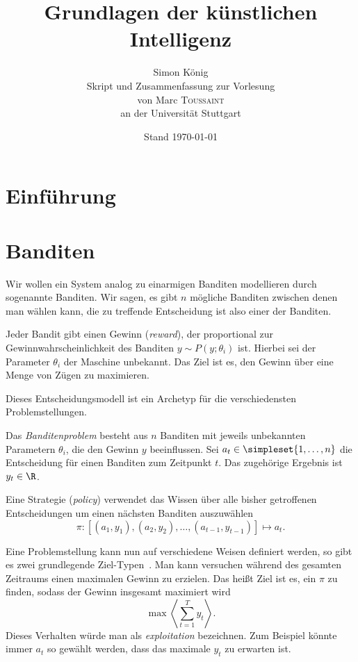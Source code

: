\documentclass[ngerman]{../LaTeX-Templates/Paper/paper}
\title{Grundlagen der künstlichen Intelligenz}
\author{Simon König\\Skript und Zusammenfassung zur Vorlesung\\ von Marc \textsc{Toussaint}\\an der Universität Stuttgart}
\date{Stand \today}
\newcommand{\countset}[1]{\simpleset{1,\ldots,#1}}
\newcommand{\enqo}[1]{\glqq #1\grqq\ }
\begin{document}
\maketitle%
\tableofcontents

\section{Einführung}



\section{Banditen}
Wir wollen ein System analog zu einarmigen Banditen modellieren durch sogenannte \glqq Banditen\grqq. Wir sagen, es gibt $n$ mögliche Banditen zwischen denen man wählen kann, die zu treffende Entscheidung ist also einer der Banditen.

Jeder Bandit gibt einen Gewinn (\emph{reward}), der proportional zur Gewinnwahrscheinlichkeit des Banditen $y\sim P(y;\theta_i)$ ist. Hierbei sei der Parameter $\theta_i$ der Maschine unbekannt. Das Ziel ist es, den Gewinn über eine Menge von Zügen zu maximieren.

Dieses Entscheidungsmodell ist ein Archetyp für die verschiedensten Problemstellungen.

\begin{definition}[Banditenproblem]\label{Banditenproblem}
	Das \emph{Banditenproblem} besteht aus $n$ Banditen mit jeweils unbekannten Parametern $\theta_i$, die den Gewinn $y$ beeinflussen.
	Sei $a_t\in\countset n$ die Entscheidung für einen Banditen zum Zeitpunkt $t$. Das zugehörige Ergebnis ist $y_t\in\R$. 

	Eine Strategie (\emph{policy}) verwendet das Wissen über alle bisher getroffenen Entscheidungen um einen nächsten Banditen auszuwählen
	\begin{equation*}
		\pi:[(a_1,y_1),(a_2,y_2),\ldots,(a_{t-1},y_{t-1})]\mapsto a_t.
	\end{equation*}
\end{definition}
Eine Problemstellung kann nun auf verschiedene Weisen definiert werden, so gibt es zwei grundlegende \enqo{Ziel-Typen}. Man kann versuchen während des gesamten Zeitraums einen maximalen Gewinn zu erzielen. Das heißt Ziel ist es, ein $\pi$ zu finden, sodass der Gewinn insgesamt maximiert wird
\begin{equation}
	\max\left\langle\sum_{t=1}^Ty_t\right\rangle.\label{policy_exploit}
\end{equation}
Dieses Verhalten würde man als \emph{exploitation} bezeichnen.
Zum Beispiel könnte immer $a_t$ so gewählt werden, dass das maximale $y_t$ zu erwarten ist.
\end{document}
